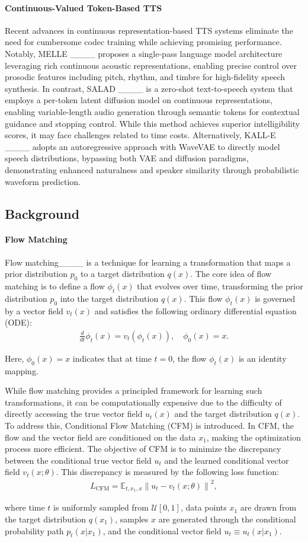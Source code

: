 \paragraph{Continuous-Valued Token-Based TTS}
Recent advances in continuous representation-based TTS systems eliminate the need for cumbersome codec training while achieving promising performance. Notably, MELLE ____ proposes a single-pass language model architecture leveraging rich continuous acoustic representations, enabling precise control over prosodic features including pitch, rhythm, and timbre for high-fidelity speech synthesis. In contrast, SALAD ____ is a zero-shot text-to-speech system that employs a per-token latent diffusion model on continuous representations, enabling variable-length audio generation through semantic tokens for contextual guidance and stopping control. While this method achieves superior intelligibility scores, it may face challenges related to time costs. Alternatively, KALL-E ____ adopts an autoregressive approach with WaveVAE to directly model speech distributions, bypassing both VAE and diffusion paradigms, demonstrating enhanced naturalness and speaker similarity through probabilistic waveform prediction.

\subsection{Background}
\paragraph{Flow Matching} 
Flow matching____ is a technique for learning a transformation that maps a prior distribution \( p_0 \) to a target distribution \( q(x) \). The core idea of flow matching is to define a flow \( \phi_t(x) \) that evolves over time, transforming the prior distribution \( p_0 \) into the target distribution \( q(x) \). This flow \( \phi_t(x) \) is governed by a vector field \( v_t(x) \) and satisfies the following ordinary differential equation (ODE):
\begin{align}
\frac{d}{dt} \phi_t(x) = v_t(\phi_t(x)), \quad \phi_0(x) = x.
\end{align}

Here, \( \phi_0(x) = x \) indicates that at time \( t = 0 \), the flow \( \phi_t(x) \) is an identity mapping.

While flow matching provides a principled framework for learning such transformations, it can be computationally expensive due to the difficulty of directly accessing the true vector field \( u_t(x) \) and the target distribution \( q(x) \). To address this, Conditional Flow Matching (CFM) is introduced. In CFM, the flow and the vector field are conditioned on the data \( x_1 \), making the optimization process more efficient. The objective of CFM is to minimize the discrepancy between the conditional true vector field \( u_t \) and the learned conditional vector field \( v_t(x; \theta) \). This discrepancy is measured by the following loss function:
\begin{align}
L_{\text{CFM}} = \mathbb{E}_{t, x_1, x} \left\| u_t - v_t(x; \theta) \right\|^2,
\end{align}

where time \( t \) is uniformly sampled from \( \mathcal{U}[0,1] \), data points \( x_1 \) are drawn from the target distribution \( q(x_1) \), samples \( x \) are generated through the conditional probability path \( p_t(x|x_1) \), and the conditional vector field \( u_t \equiv u_t(x|x_1) \).